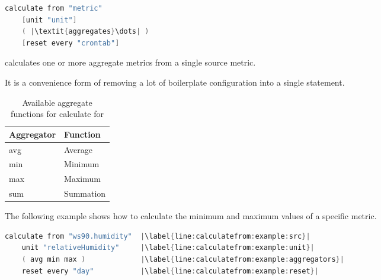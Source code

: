 \label{config:calculateFrom}

\begin{lstlisting}[language=Go,style=kaolstplain,escapechar=|]
calculate from "metric"
    [unit "unit"]
    ( |\textit{aggregates}\dots| )
    [reset every "crontab"]
\end{lstlisting}

 calculates one or more aggregate metrics from a single source metric.

It is a convenience form of  removing a lot of boilerplate configuration into a single statement.


\begin{table}[ht]
    \caption{Available aggregate functions for calculate for}
    \label{config:calculatefor:aggregate:table}
    \begin{tabular}{l l}
        \toprule
        Aggregator & Function \\
        \midrule
        avg & Average   \index{avg}\index{Aggregate!avg}\index{Function!avg}\\
        min & Minimum   \index{min}\index{Aggregate!min}\index{Function!min}\\
        max & Maximum   \index{max}\index{Aggregate!max}\index{Function!max}\\
        sum & Summation \index{sum}\index{Aggregate!sum}\index{Function!sum}\\
        \bottomrule
    \end{tabular}
\end{table}

The following example shows how to calculate the minimum and maximum values of a specific metric.

\begin{lstlisting}[language=Go,caption={Example calculation for},escapechar=|,label=lst:calculatefrom:example]
calculate from "ws90.humidity"  |\label{line:calculatefrom:example:src}|
    unit "relativeHumidity"     |\label{line:calculatefrom:example:unit}|
    ( avg min max )             |\label{line:calculatefrom:example:aggregators}|
    reset every "day"           |\label{line:calculatefrom:example:reset}|
\end{lstlisting}

